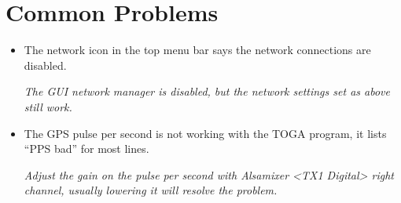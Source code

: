 \documentclass[12pt, letterpaper, onecolumn, oneside]{article}
\begin{document}
\section{Common Problems}

\begin{itemize}
\item The network icon in the top menu bar says the network connections are disabled.

\emph{The GUI network manager is disabled, but the network settings set as above still work.}

\item The GPS pulse per second is not working with the TOGA program, it lists ``PPS bad'' for most lines.

\emph{Adjust the gain on the pulse per second with Alsamixer <TX1 Digital> right channel, usually lowering it will resolve the problem.}

\end{itemize}
\end{document}
